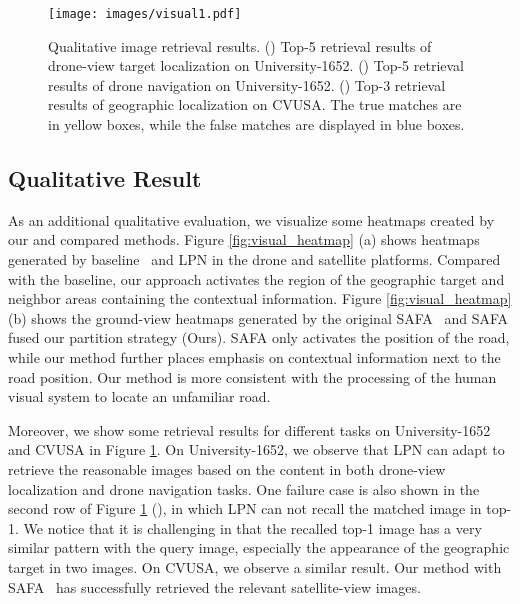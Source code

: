 \documentclass[journal]{IEEEtran}
\begin{document}
\begin{figure}[t]
  \centering
  \texttt{[image: images/visual1.pdf]}
  \caption{
  Qualitative image retrieval results. (\uppercase\expandafter{}) Top-5 retrieval results of drone-view target localization on University-1652. (\uppercase\expandafter{}) Top-5 retrieval results of drone navigation on University-1652. (\uppercase\expandafter{}) Top-3 retrieval results of geographic localization on CVUSA. The true matches are in yellow boxes, while the false matches are displayed in blue boxes.
  }
  \label{fig:visual1}
\end{figure}

\subsection{Qualitative Result} 
As an additional qualitative evaluation, we visualize some heatmaps created by our and compared methods. Figure \ref{fig:visual_heatmap} (a) shows heatmaps generated by baseline~\cite{zheng_university-1652_nodate} and LPN in the drone and satellite platforms. Compared with the baseline, our approach activates the region of the geographic target and neighbor areas containing the contextual information. Figure \ref{fig:visual_heatmap} (b) shows the ground-view heatmaps generated by the original SAFA~\cite{shi_spatial-aware_nodate} and SAFA fused our partition strategy (Ours). SAFA only activates the position of the road, while our method further places emphasis on contextual information next to the road position. Our method is more consistent with the processing of the human visual system to locate an unfamiliar road.

Moreover, we show some retrieval results for different tasks on University-1652 and CVUSA in Figure \ref{fig:visual1}. On University-1652, we observe that LPN can adapt to retrieve the reasonable images based on the content in both drone-view localization and drone navigation tasks. One failure case is also shown in the second row of Figure \ref{fig:visual1} (\uppercase\expandafter{}), in which LPN can not recall the matched image in top-1. We notice that it is challenging in that the recalled top-1 image has a very similar pattern with the query image, especially the appearance of the geographic target in two images. 
On CVUSA, we observe a similar result. Our method with SAFA~\cite{shi_spatial-aware_nodate} has successfully retrieved the relevant satellite-view images.
\end{document}
